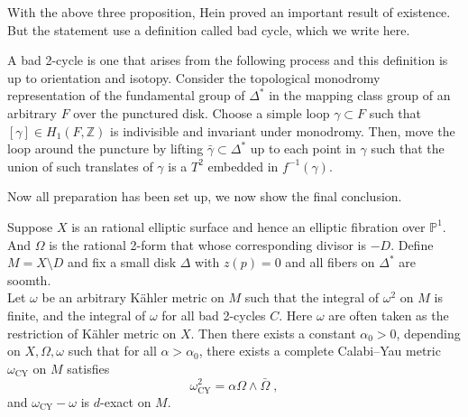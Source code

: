 With the above three proposition, Hein proved an important result of existence. But the statement use a definition called bad cycle, which we write here.
\begin{definition}
A bad 2-cycle is one that arises from the following process and this definition is up to orientation and isotopy. Consider the topological monodromy representation of the fundamental group of $\Delta^*$ in the mapping class group of an arbitrary $F$ over the punctured disk. Choose a simple loop $\gamma\subset F$ such that $[\gamma]\in H_1(F,\mathbb{Z})$ is indivisible and invariant under monodromy. Then, move the loop around the puncture by lifting $\bar{\gamma}\subset \Delta^*$ up to each point in $\gamma$ such that the union of such translates of $\gamma$ is a $T^2$ embedded in $f^{-1}(\gamma)$. 
\end{definition}
Now all preparation has been set up, we now show the final conclusion.
\begin{proposition}
Suppose $X$ is an rational elliptic surface and hence an elliptic fibration over $\mathbb{P}^1$. And $\Omega$ is the rational 2-form that whose corresponding divisor is $-D$. Define $M=X\setminus D$ and fix a small disk $\Delta$ with $z(p)=0$ and all fibers on $\Delta^*$ are soomth.\\ \indent
Let $\omega$ be an arbitrary K{\"a}hler metric on $M$ such that the integral of $\omega^2$ on $M$ is finite, and the integral of $\omega$ for all bad 2-cycles $C$. Here $\omega$ are often taken as the restriction of K{\"a}hler metric on $X$. Then there exists a constant $\alpha_0>0$, depending on $X,\Omega,\omega$ such that for all $\alpha>\alpha_0$, there exists a complete Calabi--Yau metric $\omega_{\mathrm{CY}}$ on $M $ satisfies
\[ \omega_{\mathrm{CY}}^2=\alpha\Omega\wedge \bar{\Omega}\; , \]
and $\omega_{\mathrm{CY}}-\omega$ is $d$-exact on $M$.
\end{proposition}
